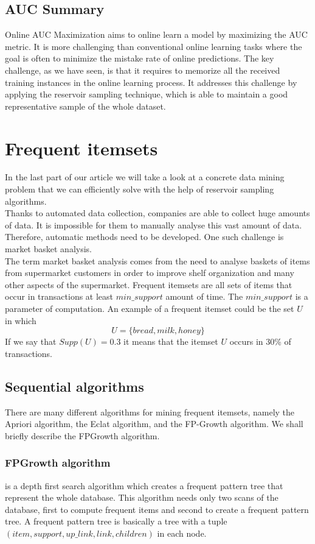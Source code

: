 \documentclass[journal]{IEEEtran/IEEEtran}
\begin{document}
\subsection{AUC Summary}
Online AUC Maximization aims to online learn a model by maximizing the AUC metric. It is more challenging than conventional online learning tasks where the goal is often to minimize the mistake rate of online predictions. The key challenge, as we have seen, is that it requires to memorize all the received training instances in the online learning process. It addresses this challenge by applying the reservoir sampling technique, which is able to maintain a good representative sample of the whole dataset.

\section{Frequent itemsets}
In the last part of our article we will take a look at a concrete data mining problem that we can efficiently solve with the help of reservoir sampling algorithms.\\

Thanks to automated data collection, companies are able to collect huge amounts of data. It is impossible for them to manually analyse this vast amount of data. Therefore, automatic methods need to be developed. One such challenge is market basket analysis.\\

The term market basket analysis comes from the need to analyse baskets of items from supermarket customers in order to improve shelf organization and many other aspects of the supermarket. Frequent itemsets are all sets of items that occur in transactions at least $min\_support$ amount of time. The $min\_support$ is a parameter of computation. An example of a frequent itemset could be the set $U$ in which $$U = \{bread, milk, honey\}$$ If we say that $Supp(U) = 0.3$ it means that the itemset $U$ occurs in 30\% of transactions. 
\subsection{Sequential algorithms}
There are many different algorithms for mining frequent itemsets, namely the Apriori algorithm, the Eclat algorithm, and the FP-Growth algorithm. We shall briefly describe the FPGrowth algorithm.
\subsubsection*{FPGrowth algorithm} is a depth first search algorithm which creates a frequent pattern tree that represent the whole database. This algorithm needs only two scans of the database, first to compute frequent items and second to create a frequent pattern tree. A frequent pattern tree is basically a tree with a tuple $(item, support, up\_link, link, children)$ in each node. \\
\end{document}

